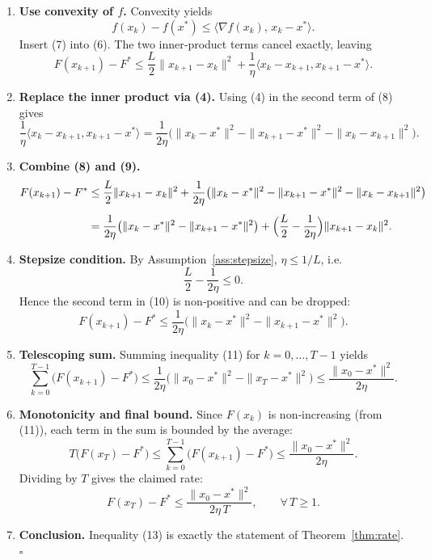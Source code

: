 \documentclass{article}
\begin{document}
\begin{enumerate}[label=[Step \arabic*], leftmargin=*]
\item \textbf{Use convexity of $f$.} Convexity yields
\[
f(x_{k})-f(x^{*})\le\langle\nabla f(x_{k}),\,x_{k}-x^{*}\rangle .
\tag{7}
\]
Insert (7) into (6). The two inner‑product terms cancel exactly, leaving
\[
F(x_{k+1})-F^{*}\le \frac{L}{2}\|x_{k+1}-x_{k}\|^{2}
+\frac{1}{\eta}\langle x_{k}-x_{k+1},x_{k+1}-x^{*}\rangle .
\tag{8}
\]

\item \textbf{Replace the inner product via (4).} Using (4) in the second term of (8) gives
\[
\frac{1}{\eta}\langle x_{k}-x_{k+1},x_{k+1}-x^{*}\rangle
=\frac{1}{2\eta}\bigl(\|x_{k}-x^{*}\|^{2}-\|x_{k+1}-x^{*}\|^{2}-\|x_{k}-x_{k+1}\|^{2}\bigr).
\tag{9}
\]

\item \textbf{Combine (8) and (9).}
\begin{align*}
F(x_{k+1})-F^{*}
&\le\frac{L}{2}\|x_{k+1}-x_{k}\|^{2}
+\frac{1}{2\eta}\bigl(\|x_{k}-x^{*}\|^{2}-\|x_{k+1}-x^{*}\|^{2}-\|x_{k}-x_{k+1}\|^{2}\bigr)\\[4pt]
&=\frac{1}{2\eta}\bigl(\|x_{k}-x^{*}\|^{2}-\|x_{k+1}-x^{*}\|^{2}\bigr)
+\Bigl(\frac{L}{2}-\frac{1}{2\eta}\Bigr)\|x_{k+1}-x_{k}\|^{2}.
\end{align*}
\item \textbf{Stepsize condition.} By Assumption~\ref{ass:stepsize}, $\eta\le1/L$, i.e.
\[
\frac{L}{2}-\frac{1}{2\eta}\le0.
\]
Hence the second term in (10) is non‑positive and can be dropped:
\[
F(x_{k+1})-F^{*}\le\frac{1}{2\eta}\bigl(\|x_{k}-x^{*}\|^{2}-\|x_{k+1}-x^{*}\|^{2}\bigr).
\tag{11}
\]

\item \textbf{Telescoping sum.} Summing inequality (11) for $k=0,\dots, T-1$ yields
\[
\sum_{k=0}^{T-1}\bigl(F(x_{k+1})-F^{*}\bigr)
\le\frac{1}{2\eta}\bigl(\|x_{0}-x^{*}\|^{2}-\|x_{T}-x^{*}\|^{2}\bigr)
\le\frac{\|x_{0}-x^{*}\|^{2}}{2\eta}.
\tag{12}
\]

\item \textbf{Monotonicity and final bound.} Since $F(x_{k})$ is non‑increasing (from (11)), each term in the sum is bounded by the average:
\[
T\bigl(F(x_{T})-F^{*}\bigr)\le\sum_{k=0}^{T-1}\bigl(F(x_{k+1})-F^{*}\bigr)
\le\frac{\|x_{0}-x^{*}\|^{2}}{2\eta}.
\]
Dividing by $T$ gives the claimed rate:
\[
F(x_{T})-F^{*}\le\frac{\|x_{0}-x^{*}\|^{2}}{2\eta\,T},\qquad\forall\,T\ge1.
\tag{13}
\]

\item \textbf{Conclusion.} Inequality (13) is exactly the statement of Theorem~\ref{thm:rate}. $\square$
\end{enumerate}
\end{document}
